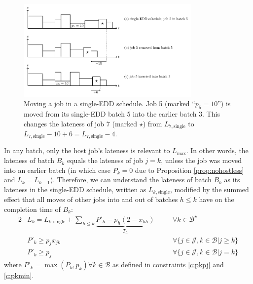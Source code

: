 \documentclass[oribibl]{llncs}
\def\Lmax{{L_{\mathrm{max}}}}
\begin{document}
\begin{figure}[th]
\centering
\includegraphics[width=0.8\textwidth]{movebasedmip.pdf}
\caption{Moving a job in a single-EDD schedule. Job 5 (marked
``$p_5 = 10$'') is moved from its single-EDD batch 5 into the earlier batch 3.
This changes the lateness of job 7 (marked $\star$) from $L_\mathrm{7,single}$
to $L_\mathrm{7,single} - 10 + 6 = L_\mathrm{7,single} - 4$.}
  \label{fig:movebasedmip}
\end{figure}

In any batch, only the host job's lateness is relevant to $\Lmax$.
In other words, the lateness of batch $B_k$ equals the lateness of
job $j=k$, unless the job was moved into an earlier batch (in which
case $P_k = 0$ due to Proposition \ref{prop:nohostless} and $L_k = L_{k-1}$). Therefore, we can understand
the lateness of batch $B_k$ as its lateness in the single-EDD schedule, written as
$L_{k,\mathrm{single}}$, modified by the summed effect that all moves of
other jobs into and out of batches $h \leq k$ have on the completion time
of $B_k$:
\begin{alignat}{2}
  \label{c:lmaxc} & L_k = L_{k,\mathrm{single}} + \sum_{h\leq k} \underbrace{P'_h - p_h(2 -
x_{hh})}_{T_h} \quad && \forall k \in \mathcal{B}^\star\\
  \label{c:pkpj} & P'_k \geq p_j x_{jk} \quad && \forall \{j \in \mathcal{J}, k \in \mathcal{B} | j \geq k\} \\
  \label{c:pkmin} & P'_k \geq p_j \quad && \forall \{j \in \mathcal{J}, k \in \mathcal{B} | j = k\}
\end{alignat}
where $P'_k = \max(P_k, p_k) \forall k \in \mathcal{B}$ as defined in
constraints \eqref{c:pkpj} and \eqref{c:pkmin}.
\end{document}
